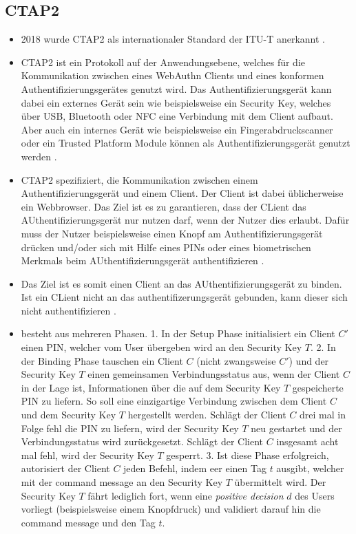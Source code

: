 \subsection{CTAP2}
\begin{itemize}
    \item 2018 wurde \ac{CTAP2} als internationaler Standard der \ac{ITU-T} anerkannt \cite{barbosa2021provable}.
    \item \ac{CTAP2} ist ein Protokoll auf der Anwendungsebene, welches für die Kommunikation zwischen eines WebAuthn Clients und eines konformen Authentifizierungsgerätes genutzt wird. Das Authentifizierungsgerät kann dabei ein externes Gerät sein wie beispielsweise ein Security Key, welches über USB, Bluetooth oder NFC eine Verbindung mit dem Client aufbaut. Aber auch ein internes Gerät wie beispielsweise ein Fingerabdruckscanner oder ein Trusted Platform Module können als Authentifizierungsgerät genutzt werden \cite{lyastani2020fido2}.
    \item \ac{CTAP2} spezifiziert, die Kommunikation zwischen einem Authentifizierungsgerät und einem Client. Der Client ist dabei üblicherweise ein Webbrowser. Das Ziel ist es zu garantieren, dass der CLient das AUthentifizierungsgerät nur nutzen darf, wenn der Nutzer dies erlaubt. Dafür muss der Nutzer beispielsweise einen Knopf am Authentifizierungsgerät drücken und/oder sich mit Hilfe eines PINs oder eines biometrischen Merkmals beim AUthentifizierungsgerät authentifizieren \cite{barbosa2021provable}.
    \item Das Ziel ist es somit einen Client an das AUthentifizierungsgerät zu binden. Ist ein CLient nicht an das authentifizerungsgerät gebunden, kann dieser sich nicht authentifizieren \cite{barbosa2021provable}.
    \item besteht aus mehreren Phasen. 
    1. In der Setup Phase initialisiert ein Client $C'$ einen PIN, welcher vom User übergeben wird an den Security Key $T$.
    2. In der Binding Phase tauschen ein Client $C$ (nicht zwangsweise $C'$) und der Security Key $T$ einen gemeinsamen Verbindungsstatus aus, wenn der Client $C$ in der Lage ist, Informationen über die auf dem Security Key $T$ gespeicherte PIN zu liefern. So soll eine einzigartige Verbindung zwischen dem Client $C$ und dem Security Key $T$ hergestellt werden. Schlägt der Client $C$ drei mal in Folge fehl die PIN zu liefern, wird der Security Key $T$ neu gestartet und der Verbindungsstatus wird zurückgesetzt. Schlägt der Client $C$ insgesamt acht mal fehl, wird der Security Key $T$ gesperrt.
    3. Ist diese Phase erfolgreich, autorisiert der Client $C$ jeden Befehl, indem eer einen Tag $t$ ausgibt, welcher mit der command message an den Security Key $T$ übermittelt wird. Der Security Key $T$ fährt lediglich fort, wenn eine \textit{positive decision} $d$ des Users vorliegt (beispielsweise einem Knopfdruck) und validiert darauf hin die command message und den Tag $t$. \cite{bindel2022fido2}

\end{itemize}
